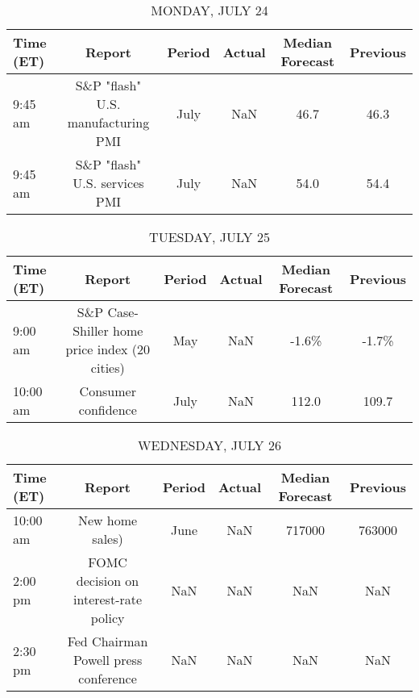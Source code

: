 \documentclass{article}%
\begin{document}
%
\normalsize%


\begin{table}[htbp]%
\caption{MONDAY, JULY 24}%
\centering%
\begin{adjustbox}{width=1\textwidth}%
\begin{tabular}{lccccc}
\toprule
Time (ET) &                             Report & Period & Actual & Median Forecast & Previous \\
\midrule
  9:45 am & S\&P "flash" U.S. manufacturing PMI &   July &    NaN &            46.7 &     46.3 \\
  9:45 am &      S\&P "flash" U.S. services PMI &   July &    NaN &            54.0 &     54.4 \\
\bottomrule
\end{tabular}
%
\end{adjustbox}%
\end{table}

%


\begin{table}[htbp]%
\caption{TUESDAY, JULY 25}%
\centering%
\begin{adjustbox}{width=1\textwidth}%
\begin{tabular}{lccccc}
\toprule
Time (ET) &                                        Report & Period & Actual & Median Forecast & Previous \\
\midrule
  9:00 am & S\&P Case-Shiller home price index (20 cities) &    May &    NaN &           -1.6\% &    -1.7\% \\
 10:00 am &                           Consumer confidence &   July &    NaN &           112.0 &    109.7 \\
\bottomrule
\end{tabular}
%
\end{adjustbox}%
\end{table}

%


\begin{table}[htbp]%
\caption{WEDNESDAY, JULY 26}%
\centering%
\begin{adjustbox}{width=1\textwidth}%
\begin{tabular}{lccccc}
\toprule
Time (ET) &                                Report & Period & Actual & Median Forecast & Previous \\
\midrule
 10:00 am &                       New home sales) &   June &    NaN &          717000 &   763000 \\
  2:00 pm & FOMC decision on interest-rate policy &    NaN &    NaN &             NaN &      NaN \\
  2:30 pm &  Fed Chairman Powell press conference &    NaN &    NaN &             NaN &      NaN \\
\bottomrule
\end{tabular}
%
\end{adjustbox}%
\end{table}
\end{document}
